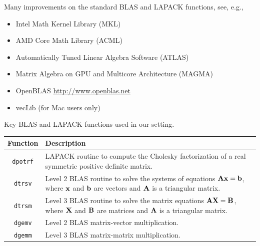 \begin{frame}
Many improvements on the standard BLAS and LAPACK functions, see, e.g.,

\begin{itemize}\setlength{\itemsep}{0.4cm}
\item Intel Math Kernel Library (MKL)
\item AMD Core Math Library (ACML)
\item Automatically Tuned Linear Algebra Software (ATLAS)
\item Matrix Algebra on GPU and Multicore Architecture (MAGMA)
\item OpenBLAS \url{http://www.openblas.net}
\item vecLib (for Mac users only)
\end{itemize}

\end{frame}

\begin{frame}
Key BLAS and LAPACK functions used in our setting.

\begin{table}[!ht]
\centering
\begin{tabularx}{\linewidth}{ c X }
  \hline
 Function& Description\\ 
  \hline
  \texttt{dpotrf} &LAPACK routine to compute the Cholesky factorization of a real symmetric positive definite matrix.\\
  \texttt{dtrsv} & Level 2 BLAS routine to solve the systems of equations $\textbf{A}\textbf{x} = \textbf{b}$, where $\textbf{x}$ and $\textbf{b}$ are vectors and $\textbf{A}$ is a triangular matrix.\\
  \texttt{dtrsm} & Level 3 BLAS routine to solve the matrix equations $\textbf{A}\textbf{X} = \textbf{B}$, where $\textbf{X}$ and $\textbf{B}$ are matrices and $\textbf{A}$ is a triangular matrix.\\
  \texttt{dgemv} & Level 2 BLAS matrix-vector multiplication.\\
  \texttt{dgemm} & Level 3 BLAS matrix-matrix multiplication.\\
   \hline
\end{tabularx}
\end{table}
\end{frame}


